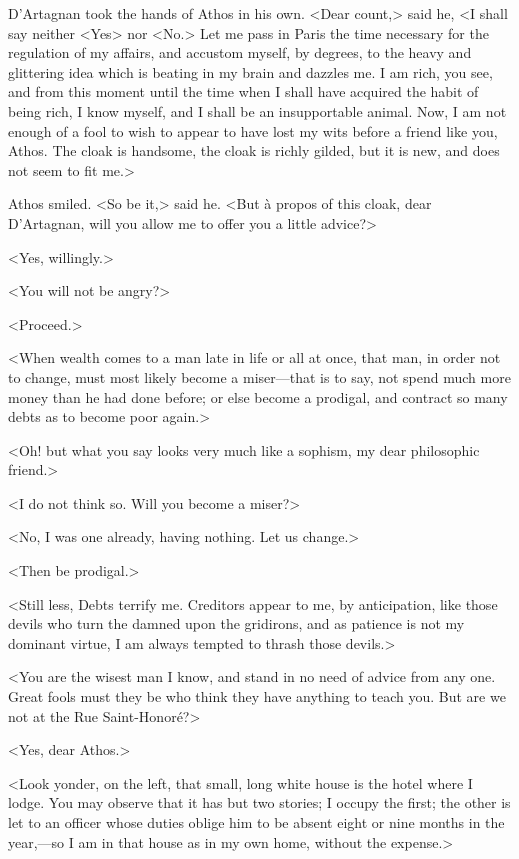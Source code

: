 D'Artagnan took the hands of Athos in his own. <Dear count,> said he, <I shall say neither <Yes> nor <No.> Let me pass in Paris the time necessary for the regulation of my affairs, and accustom myself, by degrees, to the heavy and glittering idea which is beating in my brain and dazzles me. I am rich, you see, and from this moment until the time when I shall have acquired the habit of being rich, I know myself, and I shall be an insupportable animal. Now, I am not enough of a fool to wish to appear to have lost my wits before a friend like you, Athos. The cloak is handsome, the cloak is richly gilded, but it is new, and does not seem to fit me.>

Athos smiled. <So be it,> said he. <But à propos of this cloak, dear D'Artagnan, will you allow me to offer you a little advice?>

<Yes, willingly.>

<You will not be angry?>

<Proceed.>

<When wealth comes to a man late in life or all at once, that man, in order not to change, must most likely become a miser—that is to say, not spend much more money than he had done before; or else become a prodigal, and contract so many debts as to become poor again.>

<Oh! but what you say looks very much like a sophism, my dear philosophic friend.>

<I do not think so. Will you become a miser?>

<No,  I was one already, having nothing. Let us change.>

<Then be prodigal.>

<Still less,  Debts terrify me. Creditors appear to me, by anticipation, like those devils who turn the damned upon the gridirons, and as patience is not my dominant virtue, I am always tempted to thrash those devils.>

<You are the wisest man I know, and stand in no need of advice from any one. Great fools must they be who think they have anything to teach you. But are we not at the Rue Saint-Honoré?>

<Yes, dear Athos.>

<Look yonder, on the left, that small, long white house is the hotel where I lodge. You may observe that it has but two stories; I occupy the first; the other is let to an officer whose duties oblige him to be absent eight or nine months in the year,—so I am in that house as in my own home, without the expense.>

